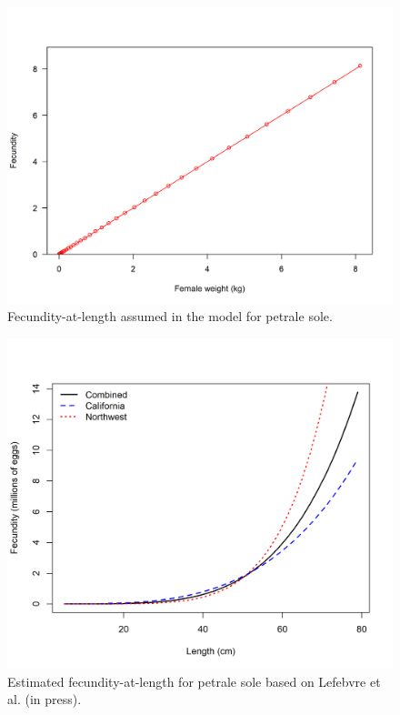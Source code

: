 \documentclass[12pt,]{article}
\begin{document}
\FloatBarrier

\begin{figure}
\centering
\includegraphics{r4ss/plots_mod1/bio8_fecundity_wt.png}
\caption{Fecundity-at-length assumed in the model for petrale sole.
\label{fig:fecundity_model}}
\end{figure}

\FloatBarrier

\begin{figure}
\centering
\includegraphics{Figures/fecundity.png}
\caption{Estimated fecundity-at-length for petrale sole based on
Lefebvre et al. (in press). \label{fig:fecundity}}
\end{figure}
\end{document}

